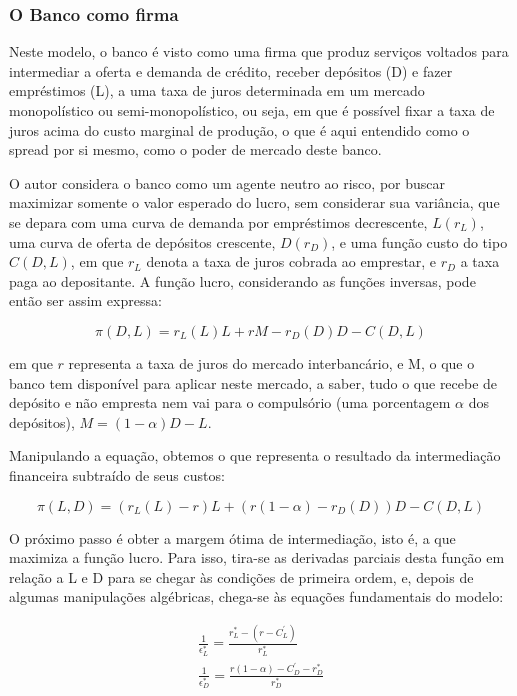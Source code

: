 \documentclass[a4paper,
               article,
               12pt,
               openany,
               oneside,
               english,
               brazil]{abntex2}
\numberwithin{equation}{section}
\begin{document}
\subsubsection{O Banco como firma}

    Neste modelo, o banco é visto como uma firma que produz serviços voltados para intermediar a oferta e demanda de crédito, receber depósitos (D) e fazer empréstimos (L), a uma taxa de juros determinada em um mercado monopolístico ou semi-monopolístico, ou seja, em que é possível fixar a taxa de juros acima do custo marginal de produção, o que é aqui entendido como o spread por si mesmo, como o poder de mercado deste banco. \cite{oreiro}

    O autor considera o banco como um agente neutro ao risco, por buscar maximizar somente o valor esperado do lucro, sem considerar sua variância, que se depara com uma curva de demanda por empréstimos decrescente, $ L(r_L) $, uma curva de oferta de depósitos crescente, $ D(r_D) $, e uma função custo do tipo $ C(D, L) $, em que $ r_L $ denota a taxa de juros cobrada ao emprestar, e $ r_D $ a taxa paga ao depositante. A função lucro, considerando as funções inversas, pode então ser assim expressa: 
    
    \begin{equation} \pi(D, L) = r_L(L)L + rM - r_D(D)D - C(D, L) \end{equation}
        
    em que $ r $ representa a taxa de juros do mercado interbancário, e M, o que o banco tem disponível para aplicar neste mercado, a saber, tudo o que recebe de depósito e não empresta nem vai para o compulsório (uma porcentagem $\alpha$ dos depósitos), $M = (1 - \alpha)D - L$. 

    Manipulando a equação, obtemos o que representa o resultado da intermediação financeira subtraído de seus custos: 
    
    \begin{equation} \pi(L, D) = (r_L(L) - r)L + (r(1 - \alpha) - r_D(D))D - C(D, L) \end{equation}

    O próximo passo é obter a margem ótima de intermediação, isto é, a que maximiza a função lucro. Para isso, tira-se as derivadas parciais desta função em relação a L e D para se chegar às condições de primeira ordem, e, depois de algumas manipulações algébricas, chega-se às equações fundamentais do modelo:

    \begin{gather}
        \frac{1}{\epsilon^{*}_L} = \frac{r^{*}_L - (r - C^{'}_L)}{r^{*}_L} \\
        \frac{1}{\epsilon^{*}_D} = \frac{r(1-\alpha)-C^{'}_D - r^{*}_D}{r^{*}_D}
    \end{gather}
\end{document}
